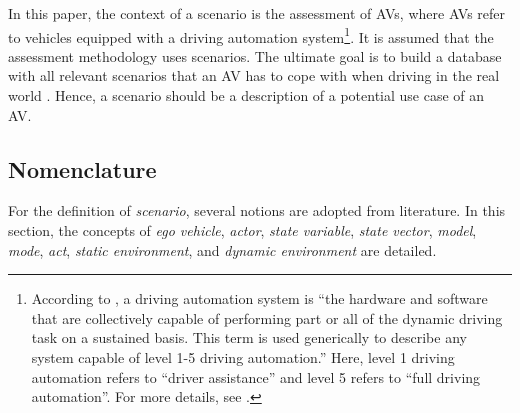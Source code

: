 In this paper, the context of a scenario is the assessment of AVs, where AVs refer to vehicles equipped with a driving automation system\footnote{According to \autocite{sae2018j3016}, a driving automation system is ``the hardware and software that are collectively capable of performing part or all of the dynamic driving task on a sustained basis. This term is used generically to describe any system capable of level 1-5 driving automation.'' Here, level 1 driving automation refers to ``driver assistance'' and level 5 refers to ``full driving automation''. For more details, see \autocite{sae2018j3016}.}. 
It is assumed that the assessment methodology uses scenarios. %
The ultimate goal is to build a database with all relevant scenarios that an AV has to cope with when driving in the real world \autocite{putz2017pegasus}. Hence, a scenario should be a description of a potential use case of an AV. 




\subsection{Nomenclature}
\label{sec:nomenclature}
For the definition of \emph{scenario}, several notions are adopted from literature. In this section, the concepts of \emph{ego vehicle}, \emph{actor}, \emph{state variable}, \emph{state vector}, \emph{model}, \emph{mode}, \emph{act}, \emph{static environment}, and \emph{dynamic environment} are detailed. 

